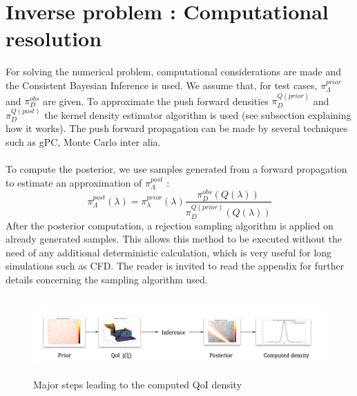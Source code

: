 \documentclass[11pt, a4paper, English]{report}
\begin{document}
\section{Inverse problem : Computational resolution}
For solving the numerical problem, computational considerations are made and the Consistent Bayesian Inference is used. We assume that, for test cases, $\pi_\Lambda^{prior}$ and $\pi_D^{obs}$ are given. To approximate the push forward densities $\pi_D^{Q(prior)}$ and $\pi_D^{Q(post)}$ the kernel density estimator algorithm is used (see subsection explaining how it works). The push forward propagation can be made by several techniques such as gPC, Monte Carlo inter alia. \\\\
To compute the posterior, we use samples generated from a forward propagation to estimate an approximation of $\pi_\Lambda^{post}$ :
$$\pi_\Lambda^{post}(\lambda)=\pi_\lambda^{prior}(\lambda)\frac{\pi_D^{obs}(Q(\lambda))}{\pi_D^{Q(prior)}(Q(\lambda))} $$
After the posterior computation, a rejection sampling algorithm is applied on already generated samples. This allows this method to be executed without the need of any additional deterministic calculation, which is very useful for long simulations such as CFD. The reader is invited to read the appendix for further details concerning the sampling algorithm used.
\begin{figure}[h!]
    \centering
    \includegraphics[width=\textwidth, height=3cm]{hec.png}
    \caption{Major steps leading to the computed QoI density}
    \label{fig:my_label}
\end{figure}
\end{document}
